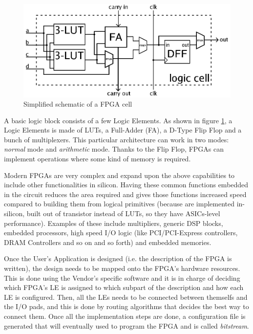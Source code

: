 \begin{figure}[H]
\centering
\includegraphics[width=1.0\linewidth]{images/chapter2/FPGA_cell_example.png}
\caption{Simplified schematic of a FPGA cell}
\label{fig:fpga_cell}
\end{figure}

A basic logic block consists of a few Logic Elements. As shown in figure \ref{fig:fpga_cell}, a Logic Elements is made of LUTs, a Full-Adder (FA), a D-Type Flip Flop and a bunch of multiplexers. This particular architecture can work in two modes: \textit{normal} mode and \textit{arithmetic} mode. Thanks to the Flip Flop, FPGAs can implement operations where some kind of memory is required.\bigskip

Modern FPGAs are very complex and expand upon the above capabilities to include other functionalities in silicon. Having these common functions embedded in the circuit reduces the area required and gives those functions increased speed compared to building them from logical primitives (because are implemented in-silicon, built out of transistor instead of LUTs, so they have ASICs-level performance). Examples of these include multipliers, generic DSP blocks, embedded processors, high speed I/O logic (like PCI/PCI-Express controllers, DRAM Controllers and so on and so forth) and embedded memories. \bigskip

Once the User's Application is designed (i.e. the description of the FPGA is written), the design needs to be mapped onto the FPGA's hardware resources. This is done using the Vendor's specific software and it is in charge of deciding which FPGA's LE is assigned to which subpart of the description and how each LE is configured. Then, all the LEs needs to be connected between themselfs and the I/O pads, and this is done by routing algorithms that decides the best way to connect them. Once all the implementation steps are done, a configuration file is generated that will eventually used to program the FPGA and is called \textit{bitstream}.\bigskip

